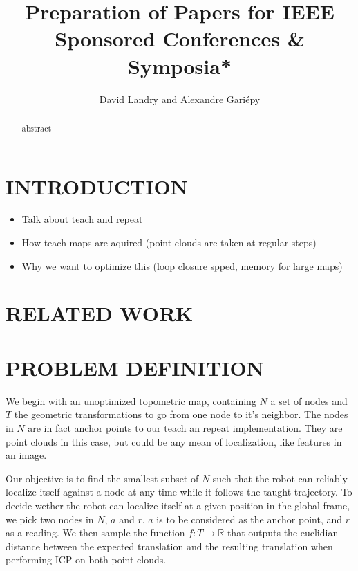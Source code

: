 \documentclass[letterpaper,10 pt,conference]{ieeeconf}
\title{\LARGE \bf
Preparation of Papers for IEEE Sponsored Conferences \& Symposia*
}
\author{David Landry and Alexandre Gari\'epy}
\begin{document}
\maketitle
\thispagestyle{empty}
\pagestyle{empty}


\begin{abstract}

  abstract

\end{abstract}

\section{INTRODUCTION}



\begin{itemize}
    \item Talk about teach and repeat
    \item How teach maps are aquired (point clouds are taken at regular steps)
    \item Why we want to optimize this (loop closure spped, memory for large maps)
\end{itemize}


\section{RELATED WORK}


\section{PROBLEM DEFINITION}

We begin with an unoptimized topometric map, containing $N$ a set of nodes and $T$ the geometric transformations to go
from one node to it's neighbor. The nodes in $N$ are in fact anchor points to our teach an repeat
implementation. They are point clouds in this case, but could be any mean of localization, like
features in an image.

Our objective is to find the smallest subset of $N$ such that the robot
can reliably localize itself against a node at any time while it follows the taught trajectory. To
decide wether the robot can localize itself at a given position in the global frame, we pick two
nodes in $N$, $a$ and $r$. $a$ is to be considered as the anchor point, and $r$ as a reading. We
then sample the function $f: T \rightarrow \mathbb{R}$ that outputs the euclidian distance between
the expected translation and the resulting translation when performing ICP on both point clouds.
\end{document}
